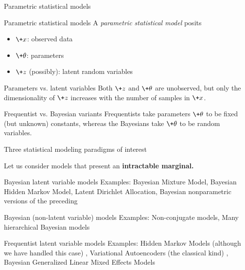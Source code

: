 \documentclass[10pt]{beamer}
\begin{document}
\begin{frame}{Parametric statistical models}

\begin{block}{Parametric statistical models}
A \textit{parametric statistical model} posits 
\begin{itemize}
\item $\+x$: observed data 
\item $\+\theta$: parameters 
\item  $\+z$ (possibly): latent random variables 
\end{itemize}
\end{block}

\vfill 
{}
\begin{block}{Parameters vs. latent variables}
Both $\+z$ and $\+\theta$ are unobserved, but only the dimensionality of $\+z$ increases with the number of samples in $\+x$.   
\end{block}


\vfill 
{}
\begin{block}{Frequentist vs. Bayesian variants}
Frequentists take parameters $\+\theta$  to be fixed (but unknown) constants, whereas the Bayesians take $\+\theta$ to be random variables. %
\end{block} 

\end{frame}


\begin{frame}{Three statistical modeling paradigms of interest}

Let us consider models that present an \bf{intractable marginal}.
 
\begin{block}{Bayesian latent variable models}
Examples: Bayesian Mixture Model, Bayesian Hidden Markov Model, Latent Dirichlet Allocation,  Bayesian nonparametric versions of the preceding
\end{block}

\begin{block}{Bayesian (non-latent variable) models}
Examples: Non-conjugate models, Many hierarchical Bayesian models
\end{block}


\begin{block}{Frequentist latent variable models}
Examples:  Hidden Markov Models \tiny (although we have handled this case)  \normalsize , Variational Autoencoders \tiny (the classical kind) \normalsize, Bayesian Generalized Linear Mixed Effects Models
\end{block}
\end{frame}
\end{document}
